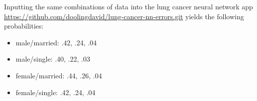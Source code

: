 \documentclass[10pt,letterpaper]{article}
\begin{document}



Inputting the same combinations of data into the lung cancer neural network app \url{https://github.com/doolingdavid/lung-cancer-nn-errors.git}
yields the following probabilities:

\begin{itemize}[noitemsep]
\item male/married: .42, .24, .04
\item male/single: .40, .22, .03
\item female/married: .44, .26, .04
\item female/single: .42, .24, .04
\end{itemize}
\end{document}
